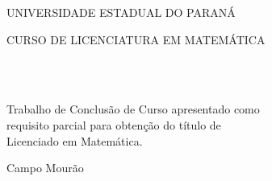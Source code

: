 
\begin{titlepage}
  \centering
  {\large UNIVERSIDADE ESTADUAL DO PARANÁ\par}
  {\large CURSO DE LICENCIATURA EM MATEMÁTICA\par}
  \vspace{4cm}

  {\Huge \bfseries \tituloTCC \par}
  \vspace{3cm}

  {\Large
    \autorUm \\[0.3cm]
    \autorDois \\[0.3cm]
    \autorTres \par
  }

  \vfill

  {\large
    Trabalho de Conclusão de Curso apresentado como \\
    requisito parcial para obtenção do título de \\
    Licenciado em Matemática.\par
  }

  \vspace{2cm}
  {\large Campo Mourão \\ \the\year \par}
\end{titlepage}

